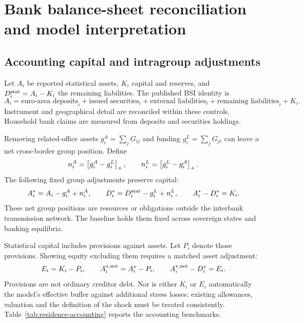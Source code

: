\section{Bank balance-sheet reconciliation and model interpretation}
\label{app:residence-model-mapping}

\subsection{Accounting capital and intragroup adjustments}

Let $A_i$ be reported statistical assets, $K_i$ capital and reserves, and $D_i^{\rm stat}=A_i-K_i$ the remaining liabilities. The published BSI identity is
\[
 A_i=\text{euro-area deposits}_i+\text{issued securities}_i
       +\text{external liabilities}_i+\text{remaining liabilities}_i+K_i.
\]
Instrument and geographical detail are reconciled within these controls. Household bank claims are measured from deposits and securities holdings.

Removing related-office assets $g_i^A=\sum_jG_{ij}$ and funding $g_i^L=\sum_jG_{ji}$ can leave a net cross-border group position. Define
\[
 n_i^A=\left[g_i^A-g_i^L\right]_+,\qquad
 n_i^L=\left[g_i^L-g_i^A\right]_+.
\]
The following fixed group adjustments preserve capital:
\begin{equation}
 A_i^*=A_i-g_i^A+n_i^A,\qquad
 D_i^*=D_i^{\rm stat}-g_i^L+n_i^L,\qquad
 A_i^*-D_i^*=K_i.
 \label{eq:group-bridge}
\end{equation}
These net group positions are resources or obligations outside the interbank transmission network. The baseline holds them fixed across sovereign states and banking equilibria.

Statistical capital includes provisions against assets. Let $P_i$ denote those provisions. Showing equity excluding them requires a matched asset adjustment:
\begin{equation}
 E_i=K_i-P_i,\qquad A_i^{*,\rm net}=A_i^*-P_i,
 \qquad A_i^{*,\rm net}-D_i^*=E_i.
 \label{eq:provision-bridge}
\end{equation}
Provisions are not ordinary creditor debt. Nor is either $K_i$ or $E_i$ automatically the model's effective buffer against additional stress losses: existing allowances, valuation and the definition of the shock must be treated consistently. Table~\ref{tab:residence-accounting} reports the accounting benchmarks.


